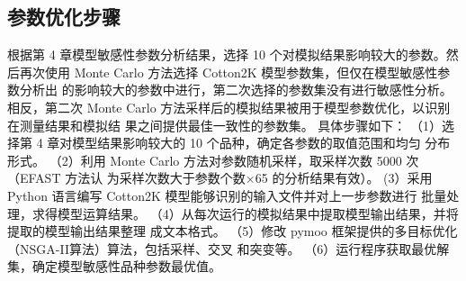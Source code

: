 \subsection{参数优化步骤}
根据第 4 章模型敏感性参数分析结果，选择 10 个对模拟结果影响较大的参数。然 后再次使用 Monte Carlo 方法选择 Cotton2K 模型参数集，但仅在模型敏感性参数分析出 的影响较大的参数中进行，第二次选择的参数集没有进行敏感性分析。相反，第二次 Monte Carlo 方法采样后的模拟结果被用于模型参数优化，以识别在测量结果和模拟结 果之间提供最佳一致性的参数集。 具体步骤如下： （1）选择第 4 章对模型结果影响较大的 10 个品种，确定各参数的取值范围和均匀 分布形式。 （2）利用 Monte Carlo 方法对参数随机采样，取采样次数 5000 次（EFAST 方法认 为采样次数大于参数个数×65 的分析结果有效）。 (3）采用 Python 语言编写 Cotton2K 模型能够识别的输入文件并对上一步参数进行 批量处理，求得模型运算结果。 （4）从每次运行的模拟结果中提取模型输出结果，并将提取的模型输出结果整理 成文本格式。 （5）修改 pymoo 框架提供的多目标优化（NSGA-II算法）算法，包括采样、交叉 和突变等。 （6）运行程序获取最优解集，确定模型敏感性品种参数最优值。
